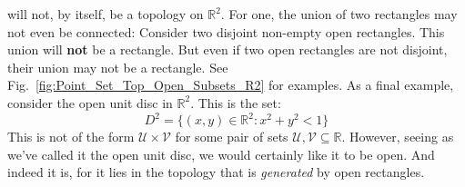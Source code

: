     will not, by itself, be a topology on $\mathbb{R}^{2}$.
    For one, the union of two rectangles may not even be
    connected: Consider two disjoint non-empty open rectangles.
    This union will \textbf{not} be a rectangle.
    But even if two open rectangles are not disjoint,
    their union may not be a rectangle. See
    Fig.~\ref{fig:Point_Set_Top_Open_Subsets_R2} for examples.
    As a final example, consider the open unit disc in
    $\mathbb{R}^{2}$. This is the set:
    \begin{equation}
        D^{2}=\{(x,y)\in\mathbb{R}^{2}:x^{2}+y^{2}<1\}
    \end{equation}
    This is not of the form $\mathcal{U}\times\mathcal{V}$ for
    some pair of sets $\mathcal{U},\mathcal{V}\subseteq\mathbb{R}$.
    However, seeing as we've called it the open unit disc, we
    would certainly like it to be open. And indeed it is, for
    it lies in the topology that is \textit{generated}
    by open rectangles.
